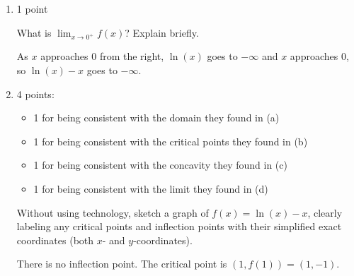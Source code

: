 \documentclass{article}
\begin{document}
\begin{enumerate}
\begin{enumerate}
    \begin{solution} 
      The second derivative will tell us about the concavity. $$ f''(x) = -\frac{1}{x^2}$$ is negative everywhere. This means that the function is .
    \end{solution} 

  \item

    \begin{grading}
      1 point
    \end{grading}

    \begin{problem}[1.5in]
      What is $\displaystyle \lim_{x \to 0^+} f(x)$? Explain briefly. 
    \end{problem}

    \begin{solution}
      As $x$ approaches $0$ from the right,
      $\ln(x)$ goes to $-\infty$ and $x$ approaches
      $0$, so $\ln(x) -x$ goes to $\boxed{-\infty}$.
    \end{solution}

  \item

    \begin{grading}
      4 points:
      \begin{itemize}[nosep]
      \item 1 for being consistent with the domain they found in (a)
      \item 1 for being consistent with the critical points they found in (b)
      \item 1 for being consistent with the concavity they found in (c)
      \item 1 for being consistent with the limit they found in (d)
      \end{itemize}
    \end{grading}

    \begin{problem}[\vfill\newpage]
      Without using technology, sketch a graph of $f(x) = \ln (x) - x$, clearly labeling any critical points and inflection points with their simplified exact coordinates (both $x$- and $y$-coordinates).
    \end{problem}

    \begin{solution}
      There is no inflection point. The critical point is $(1, f(1)) = (1, -1)$. 
      \begin{center}
      \end{center}
    \end{solution}


\end{enumerate}
\end{enumerate}
\end{document}
